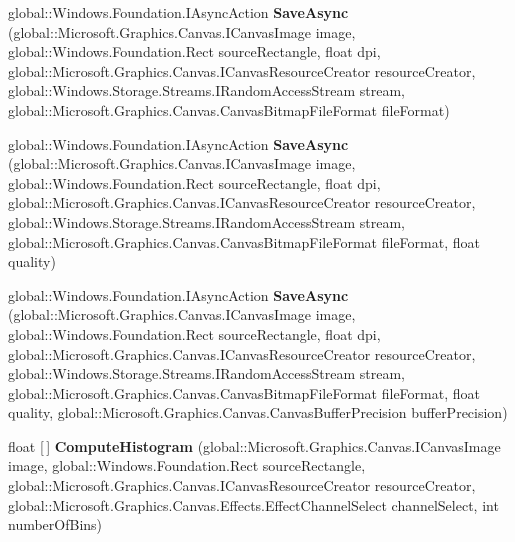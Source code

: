 \begin{DoxyCompactItemize}
global\+::\+Windows.\+Foundation.\+I\+Async\+Action {\bfseries Save\+Async} (global\+::\+Microsoft.\+Graphics.\+Canvas.\+I\+Canvas\+Image image, global\+::\+Windows.\+Foundation.\+Rect source\+Rectangle, float dpi, global\+::\+Microsoft.\+Graphics.\+Canvas.\+I\+Canvas\+Resource\+Creator resource\+Creator, global\+::\+Windows.\+Storage.\+Streams.\+I\+Random\+Access\+Stream stream, global\+::\+Microsoft.\+Graphics.\+Canvas.\+Canvas\+Bitmap\+File\+Format file\+Format)
\item 
\mbox{\label{interface_microsoft_1_1_graphics_1_1_canvas_1_1_i_canvas_image_statics_a1d356baa8a7f7e5d8a5a583ba30a2008}} 
global\+::\+Windows.\+Foundation.\+I\+Async\+Action {\bfseries Save\+Async} (global\+::\+Microsoft.\+Graphics.\+Canvas.\+I\+Canvas\+Image image, global\+::\+Windows.\+Foundation.\+Rect source\+Rectangle, float dpi, global\+::\+Microsoft.\+Graphics.\+Canvas.\+I\+Canvas\+Resource\+Creator resource\+Creator, global\+::\+Windows.\+Storage.\+Streams.\+I\+Random\+Access\+Stream stream, global\+::\+Microsoft.\+Graphics.\+Canvas.\+Canvas\+Bitmap\+File\+Format file\+Format, float quality)
\item 
\mbox{\label{interface_microsoft_1_1_graphics_1_1_canvas_1_1_i_canvas_image_statics_a21753a6236cd5f5b4187172eb1f59d72}} 
global\+::\+Windows.\+Foundation.\+I\+Async\+Action {\bfseries Save\+Async} (global\+::\+Microsoft.\+Graphics.\+Canvas.\+I\+Canvas\+Image image, global\+::\+Windows.\+Foundation.\+Rect source\+Rectangle, float dpi, global\+::\+Microsoft.\+Graphics.\+Canvas.\+I\+Canvas\+Resource\+Creator resource\+Creator, global\+::\+Windows.\+Storage.\+Streams.\+I\+Random\+Access\+Stream stream, global\+::\+Microsoft.\+Graphics.\+Canvas.\+Canvas\+Bitmap\+File\+Format file\+Format, float quality, global\+::\+Microsoft.\+Graphics.\+Canvas.\+Canvas\+Buffer\+Precision buffer\+Precision)
\item 
\mbox{\label{interface_microsoft_1_1_graphics_1_1_canvas_1_1_i_canvas_image_statics_a21324f0dd43dd52006fc02fb9aa474d3}} 
float \mbox{[}$\,$\mbox{]} {\bfseries Compute\+Histogram} (global\+::\+Microsoft.\+Graphics.\+Canvas.\+I\+Canvas\+Image image, global\+::\+Windows.\+Foundation.\+Rect source\+Rectangle, global\+::\+Microsoft.\+Graphics.\+Canvas.\+I\+Canvas\+Resource\+Creator resource\+Creator, global\+::\+Microsoft.\+Graphics.\+Canvas.\+Effects.\+Effect\+Channel\+Select channel\+Select, int number\+Of\+Bins)

\end{DoxyCompactItemize}
